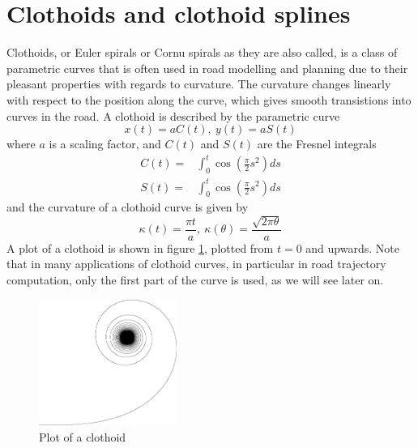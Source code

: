 \section{Clothoids and clothoid splines}
\label{sec:back_clothoid}
Clothoids, or Euler spirals or Cornu spirals as they are also called, is a class of parametric curves that is often used in road modelling and planning due to their pleasant properties with regards to curvature. The curvature changes linearly with respect to the position along the curve, which gives smooth transistions into curves in the road. A clothoid is described by the parametric curve
\begin{equation}
x(t) = aC(t),\  y(t) = aS(t) 
\label{eq:clothoid}
\end{equation}
where $a$ is a scaling factor, and $C(t)$ and $S(t)$ are the Fresnel integrals
\begin{align}
C(t) =& \int_0^t \cos\left(\frac{\pi}{2}s^2\right) ds \label{eq:fresnel_c}\\
S(t) =& \int_0^t \cos\left(\frac{\pi}{2}s^2\right) ds \label{eq:fresnel_s}
\end{align}
and the curvature of a clothoid curve is given by 
\begin{equation}
\kappa(t) = \frac{\pi t}{a},\ \kappa(\theta) = \frac{\sqrt{2\pi\theta}}{a}
\label{eq:clothoid_curvature}
\end{equation}
A plot of a clothoid is shown in figure \ref{fig:back_clothoid}, plotted from $t=0$ and upwards. Note that in many applications of clothoid curves, in particular in road trajectory computation, only the first part of the curve is used, as we will see later on.

\begin{figure}[ht]
\centering
\includegraphics[width=0.4\textwidth]{figure/cornu}
\caption{Plot of a clothoid}
\label{fig:back_clothoid}
\end{figure}

